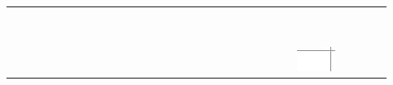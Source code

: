 \documentclass[10pt]{article}
\begin{document}
\begin{center}
\begin{tabular}{|c|c|c|c|c|c|c|c|c|c|c|c|c|c|c|c|c|c|c|c|c|c|c|c|c|c|c|c|c|c|}
\hline
 &  &  &  &  &  &  &  &  &  &  &  &  &  &  &  &  &  &  &  &  &  &  &  &  &  &  &  &  &  \\
\hline
 &  &  &  &  &  &  &  &  &  &  &  &  &  &  &  &  &  &  &  &  &  &  &  &  &  &  &  &  &  \\
\hline
 &  &  &  &  &  &  &  &  &  &  &  &  &  &  &  &  &  &  &  &  &  &  &  &  &  &  &  &  &  \\
\hline
 &  &  &  &  &  &  &  &  &  &  &  &  &  &  &  &  &  &  &  &  &  &  &  &  &  &  &  &  &  \\
\hline
 &  &  &  &  &  &  &  &  &  &  &  &  &  &  &  &  &  &  &  &  &  &  &  &  &  &  &  &  &  \\
\hline
 &  &  &  &  &  &  &  &  &  &  &  &  &  &  &  &  &  &  &  &  &  &  &  &  &  &  &  &  &  \\
\hline
 &  &  &  &  &  &  &  &  &  &  &  &  &  &  &  &  &  &  &  &  &  &  &  &  &  &  &  &  &  \\
\hline
 &  &  &  &  &  &  &  &  &  &  &  &  &  &  &  &  &  &  &  &  &  &  &  &  &  &  &  &  &  \\
\hline
 &  &  &  &  &  &  &  &  &  &  &  &  &  &  &  &  &  &  &  &  &  &  &  &  &  &  &  &  &  \\
\hline
 &  &  &  &  &  &  &  &  &  &  &  &  &  &  &  &  &  &  &  &  &  &  &  &  &  &  &  &  &  \\
\hline
 &  &  &  &  &  &  &  &  &  &  &  &  &  &  &  &  &  &  &  &  &  &  &  &  & \includegraphics[max width=\textwidth]{2024_11_21_e15da647cf0a41077ac3g-10(2)}

\end{tabular}
\end{center}
\end{document}
